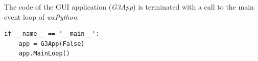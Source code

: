 \documentclass[12pt]{article}
\begin{document}
The code of the GUI application ({\it G3App}) is terminated with a
call to the main event loop of {\it wxPython}.


{\footnotesize
  \linenumbers
\begin{verbatim}
if __name__ == '__main__':
    app = G3App(False)
    app.MainLoop()
\end{verbatim}
}

%
%






\end{document}
